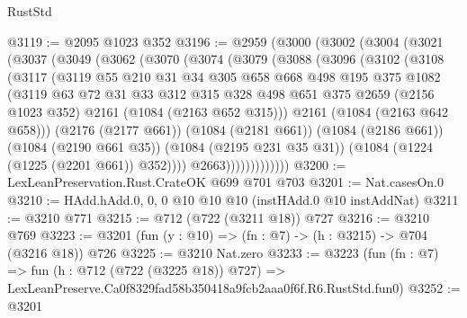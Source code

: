 \begin{lexlean}{RustStd}
\begin{coremodule}
@3119 := @2095 @1023 @352
@3196 := @2959
    (@3000
      (@3002
        (@3004
          (@3021
            (@3037
              (@3049
                (@3062
                  (@3070
                    (@3074
                      (@3079
                        (@3088
                          (@3096
                            (@3102
                              (@3108
                                (@3117
                                  (@3119
                                    @55
                                    @210
                                    @31
                                    @34
                                    @305
                                    @658
                                    @668
                                    @498
                                    @195
                                    @375
                                    @1082
                                    (@3119
                                      @63
                                      @72
                                      @31
                                      @33
                                      @312
                                      @315
                                      @328
                                      @498
                                      @651
                                      @375
                                      @2659
                                      (@2156 @1023 @352)
                                      @2161
                                      (@1084 (@2163 @652 @315)))
                                    @2161
                                    (@1084 (@2163 @642 @658)))
                                  (@2176 (@2177 @661))
                                  (@1084 (@2181 @661))
                                  (@1084 (@2186 @661))
                                  (@1084 (@2190 @661 @35))
                                  (@1084 (@2195 @231 @35 @31))
                                  (@1084 (@1224 (@1225 (@2201 @661)) @352))))
                              @2663)))))))))))))
@3200 := LexLeanPreservation.Rust.CrateOK @699 @701 @703
@3201 := Nat.casesOn.{0}
@3210 := HAdd.hAdd.{0, 0, 0} @10 @10 @10 (instHAdd.{0} @10 instAddNat)
@3211 := @3210 @771
@3215 := @712 (@722 (@3211 @18)) @727
@3216 := @3210 @769
@3223 := @3201 (fun (y : @10) => (fn : @7) -> (h : @3215) -> @704 (@3216 @18)) @726
@3225 := @3210 Nat.zero
@3233 := @3223
    (fun (fn : @7) =>
    fun (h : @712 (@722 (@3225 @18)) @727) =>
    LexLeanPreserve.Ca0f8329fad58b350418a9fcb2aaa0f6f.R6.RustStd.fun0)
@3252 := @3201

\end{coremodule}
\end{lexlean}
